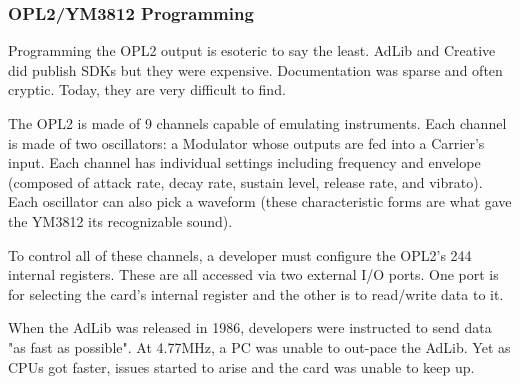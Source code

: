 \subsubsection{OPL2/YM3812 Programming}
\label{IMF_explanation}
\par
Programming the OPL2 output is esoteric to say the least. AdLib and Creative did publish SDKs but they were expensive.  Documentation was sparse and often cryptic. Today, they are very difficult to find.\\
\par
The OPL2 is made of 9 channels capable of emulating instruments. Each channel is made of two oscillators: a Modulator whose outputs are fed into a Carrier's input. Each channel has individual settings including frequency and envelope (composed of attack rate, decay rate, sustain level, release rate, and vibrato). Each oscillator can also pick a waveform (these characteristic forms are what gave the YM3812 its recognizable sound).\\
\par
 To control all of these channels, a developer must configure the OPL2's 244 internal registers. These are all accessed via two external I/O ports. One port is for selecting the card's internal register and the other is to read/write data to it.\\
\par
\begin{minipage}{\textwidth}

\end{minipage}
\par
When the AdLib was released in 1986, developers were instructed to send data "as fast as possible". At 4.77MHz, a PC was unable to out-pace the AdLib. Yet as CPUs got faster, issues started to arise and the card was unable to keep up.\\
\par

